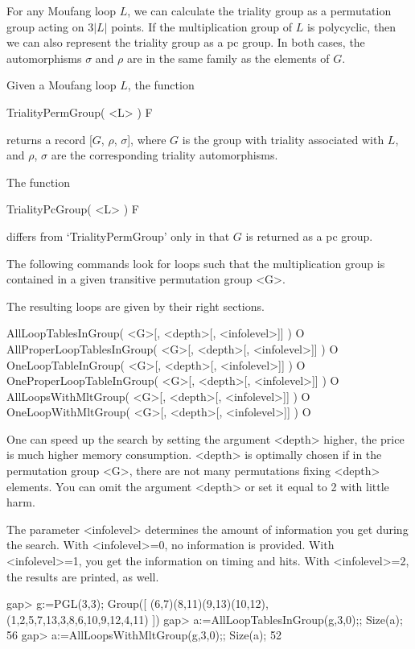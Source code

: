 For any Moufang loop $L$, we can calculate the triality group as a permutation
group acting on $3|L|$ points. If the multiplication group of $L$ is
polycyclic, then we can also represent the triality group as a pc group. In
both cases, the automorphisms $\sigma$ and $\rho$ are in the same family as the
elements of $G$.

Given a Moufang loop $L$, the function

\>TrialityPermGroup( <L> ) F

returns a record [$G$, $\rho$, $\sigma$], where $G$ is the group with triality
associated with $L$, and $\rho$, $\sigma$ are the corresponding triality
automorphisms.

The function

\>TrialityPcGroup( <L> ) F

differs from `TrialityPermGroup' only in that $G$ is returned as a pc group.


The following commands look for loops such that the multiplication group is
contained in a given transitive permutation group <G>.

The resulting loops are given by their right sections.

\>AllLoopTablesInGroup( <G>[, <depth>[, <infolevel>]] ) O
\>AllProperLoopTablesInGroup( <G>[, <depth>[, <infolevel>]] ) O
\>OneLoopTableInGroup( <G>[, <depth>[, <infolevel>]] ) O
\>OneProperLoopTableInGroup( <G>[, <depth>[, <infolevel>]] ) O
\>AllLoopsWithMltGroup( <G>[, <depth>[, <infolevel>]] ) O
\>OneLoopWithMltGroup( <G>[, <depth>[, <infolevel>]] ) O

One can speed up the search by setting the argument <depth> higher, the price
is much higher memory consumption. <depth> is optimally chosen if in the permutation group <G>, there are not
many permutations fixing <depth> elements. You can omit the argument <depth> or set it equal to
2 with little harm.

The parameter <infolevel> determines the amount of information you get during
the search. With <infolevel>=0, no information is provided.
With <infolevel>=1, you get the information on timing and hits.
With <infolevel>=2, the results are printed, as well.

\beginexample
gap> g:=PGL(3,3);
Group([ (6,7)(8,11)(9,13)(10,12), (1,2,5,7,13,3,8,6,10,9,12,4,11) ])
gap> a:=AllLoopTablesInGroup(g,3,0);; Size(a);
56
gap> a:=AllLoopsWithMltGroup(g,3,0);; Size(a);
52
\endexample
